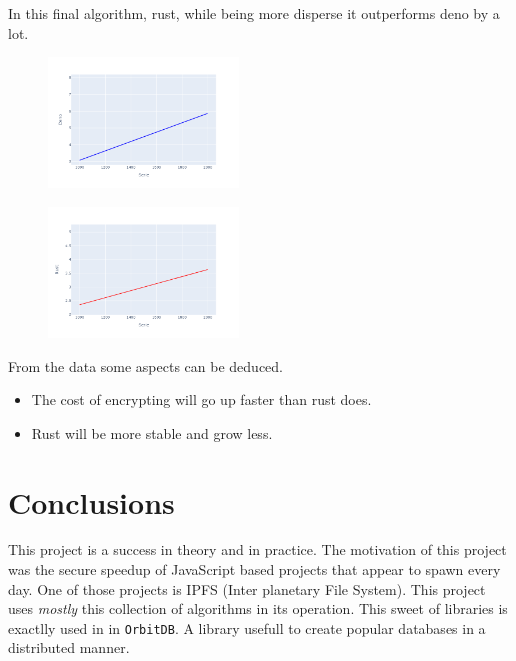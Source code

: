 \documentclass[12pt, letterpaper]{article}
\begin{document}
\begin{multicols}{2}
    In this final algorithm, rust, while being more disperse it outperforms deno by a lot.

    \begin{figure}[H]
        \centering
        \includegraphics[width=0.45\textwidth]{trend_box_deno}
    \end{figure}

    \begin{figure}[H]
        \centering
        \includegraphics[width=0.45\textwidth]{images/trend_box_rust}
    \end{figure}

    From the data some aspects can be deduced.
    \begin{itemize}
        \item The cost of encrypting will go up faster than rust does.
        \item Rust will be more stable and grow less.
    \end{itemize}

    \section{Conclusions}

    This project is a success in theory and in practice. The motivation of this project was the secure speedup of JavaScript based projects that appear to spawn every day. One of those projects is IPFS (Inter planetary File System). This project uses \textit{mostly} this collection of algorithms in its operation. This sweet of libraries is exactlly used in in \verb|OrbitDB|. A library usefull to create popular databases in a distributed manner.


\end{multicols}
\end{document}

